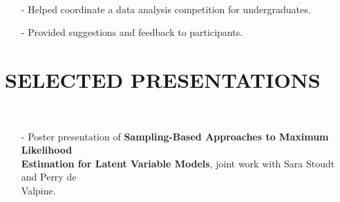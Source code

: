 \documentclass{res}
\begin{document}
\begin{resume}
  \\ 
    \begin{itemize}\setlength\itemsep{0em}
    \item[-] Helped coordinate a data analysis competition for undergraduates.
    \item[-] Provided suggestions and feedback to participants.
    \end{itemize}
    
\section{SELECTED PRESENTATIONS}
  \\ 
    \begin{itemize}\setlength\itemsep{0em}
    \item[-] Poster presentation of \textbf{Sampling-Based Approaches to Maximum Likelihood \\Estimation for Latent Variable Models}, joint work with Sara Stoudt and Perry de \\Valpine.
    \end{itemize}
    

\end{resume}
\end{document}
